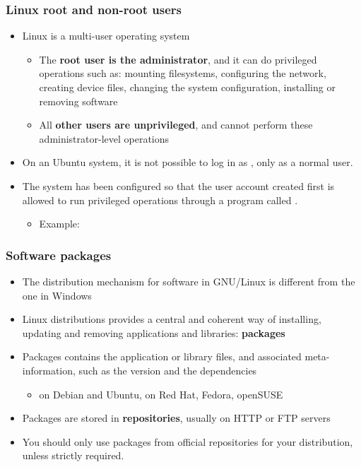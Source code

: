 \begin{frame}
  \frametitle{Linux root and non-root users}
  \begin{itemize}
  \item Linux is a multi-user operating system
    \begin{itemize}
    \item The {\bf root user is the administrator}, and it can do
      privileged operations such as: mounting filesystems, configuring
      the network, creating device files, changing the system
      configuration, installing or removing software
    \item All {\bf other users are unprivileged}, and cannot perform
      these administrator-level operations
    \end{itemize}
  \item On an Ubuntu system, it is not possible to log in as
    , only as a normal user.
  \item The system has been configured so that the user account
    created first is allowed to run privileged operations through a
    program called .\\
    \begin{itemize}
    \item Example: 
    \end{itemize}
  \end{itemize}
\end{frame}

\begin{frame}
  \frametitle{Software packages}
  \begin{itemize}
  \item The distribution mechanism for software in GNU/Linux is
    different from the one in Windows
  \item Linux distributions provides a central and coherent way of
    installing, updating and removing applications and libraries:
    {\bf packages}
  \item Packages contains the application or library files, and
    associated meta-information, such as the version and the
    dependencies
    \begin{itemize}
    \item {} on Debian and Ubuntu,  on Red Hat,
      Fedora, openSUSE
    \end{itemize}
  \item Packages are stored in {\bf repositories}, usually on HTTP or
    FTP servers
  \item You should only use packages from official repositories for your
    distribution, unless strictly required.
\end{itemize}
\end{frame}

